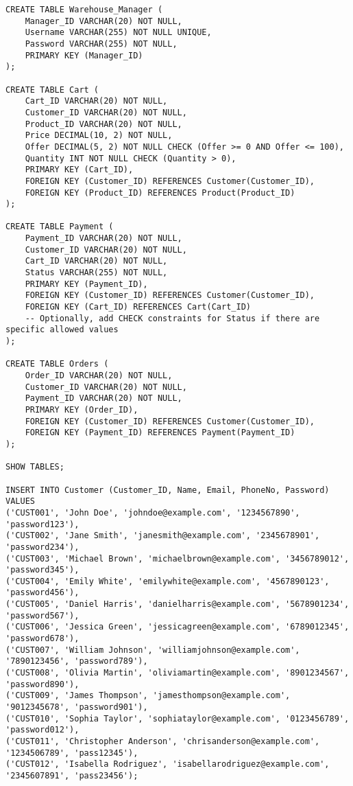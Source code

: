 \documentclass[12pt]{article}
\begin{document}
\begin{verbatim}
CREATE TABLE Warehouse_Manager (
    Manager_ID VARCHAR(20) NOT NULL,
    Username VARCHAR(255) NOT NULL UNIQUE,
    Password VARCHAR(255) NOT NULL,
    PRIMARY KEY (Manager_ID)
);

CREATE TABLE Cart (
    Cart_ID VARCHAR(20) NOT NULL,
    Customer_ID VARCHAR(20) NOT NULL,
    Product_ID VARCHAR(20) NOT NULL,
    Price DECIMAL(10, 2) NOT NULL,
    Offer DECIMAL(5, 2) NOT NULL CHECK (Offer >= 0 AND Offer <= 100),
    Quantity INT NOT NULL CHECK (Quantity > 0),
    PRIMARY KEY (Cart_ID),
    FOREIGN KEY (Customer_ID) REFERENCES Customer(Customer_ID),
    FOREIGN KEY (Product_ID) REFERENCES Product(Product_ID)
);

CREATE TABLE Payment (
    Payment_ID VARCHAR(20) NOT NULL,
    Customer_ID VARCHAR(20) NOT NULL,
    Cart_ID VARCHAR(20) NOT NULL,
    Status VARCHAR(255) NOT NULL,
    PRIMARY KEY (Payment_ID),
    FOREIGN KEY (Customer_ID) REFERENCES Customer(Customer_ID),
    FOREIGN KEY (Cart_ID) REFERENCES Cart(Cart_ID)
    -- Optionally, add CHECK constraints for Status if there are specific allowed values
);

CREATE TABLE Orders (
    Order_ID VARCHAR(20) NOT NULL,
    Customer_ID VARCHAR(20) NOT NULL,
    Payment_ID VARCHAR(20) NOT NULL,
    PRIMARY KEY (Order_ID),
    FOREIGN KEY (Customer_ID) REFERENCES Customer(Customer_ID),
    FOREIGN KEY (Payment_ID) REFERENCES Payment(Payment_ID)
);

SHOW TABLES;

INSERT INTO Customer (Customer_ID, Name, Email, PhoneNo, Password) VALUES
('CUST001', 'John Doe', 'johndoe@example.com', '1234567890', 'password123'),
('CUST002', 'Jane Smith', 'janesmith@example.com', '2345678901', 'password234'),
('CUST003', 'Michael Brown', 'michaelbrown@example.com', '3456789012', 'password345'),
('CUST004', 'Emily White', 'emilywhite@example.com', '4567890123', 'password456'),
('CUST005', 'Daniel Harris', 'danielharris@example.com', '5678901234', 'password567'),
('CUST006', 'Jessica Green', 'jessicagreen@example.com', '6789012345', 'password678'),
('CUST007', 'William Johnson', 'williamjohnson@example.com', '7890123456', 'password789'),
('CUST008', 'Olivia Martin', 'oliviamartin@example.com', '8901234567', 'password890'),
('CUST009', 'James Thompson', 'jamesthompson@example.com', '9012345678', 'password901'),
('CUST010', 'Sophia Taylor', 'sophiataylor@example.com', '0123456789', 'password012'),
('CUST011', 'Christopher Anderson', 'chrisanderson@example.com', '1234506789', 'pass12345'),
('CUST012', 'Isabella Rodriguez', 'isabellarodriguez@example.com', '2345607891', 'pass23456');


\end{verbatim}
\end{document}
